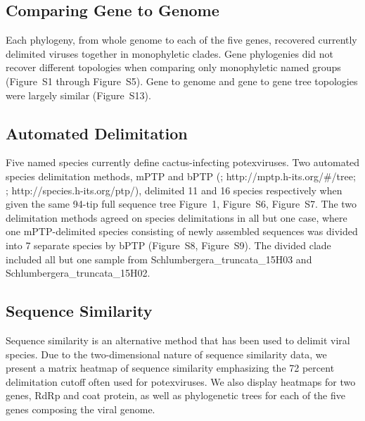 \documentclass[fleqn,10pt,lineno]{wlpeerj}
\begin{document}
{\subsection*{Comparing Gene to Genome}
Each phylogeny, from whole genome to each of the five genes, recovered currently delimited viruses together in monophyletic clades. 
Gene phylogenies did not recover different topologies when comparing only monophyletic named groups ({Figure~S1 through Figure~S5}). 
Gene to genome and gene to gene tree topologies were largely similar ({Figure~S13}).

\subsection*{Automated Delimitation}
Five named species currently define cactus-infecting potexviruses. 
Two automated species delimitation methods, mPTP and bPTP (\citealt{Kapli_2017}; http://mptp.h-its.org/\#/tree; \citealt{Zhang_2013}; http://species.h-its.org/ptp/), delimited 11 and 16 species respectively when given the same 94-tip full sequence tree {Figure~1, Figure~S6, Figure~S7}. 
The two delimitation methods agreed on species delimitations in all but one case, where one mPTP-delimited species consisting of newly assembled sequences was divided into 7 separate species by bPTP ({Figure~S8, Figure~S9}).
The divided clade included all but one sample from Schlumbergera\_truncata\_15H03 and Schlumbergera\_truncata\_15H02.

\subsection*{Sequence Similarity}
Sequence similarity is an alternative method that has been used to delimit viral species.
Due to the two-dimensional nature of sequence similarity data, we present a matrix heatmap of sequence similarity emphasizing the 72 percent delimitation cutoff often used for potexviruses. %
We also display heatmaps for two genes, RdRp and coat protein, as well as phylogenetic trees for each of the five genes composing the viral genome. 




}
\end{document}
